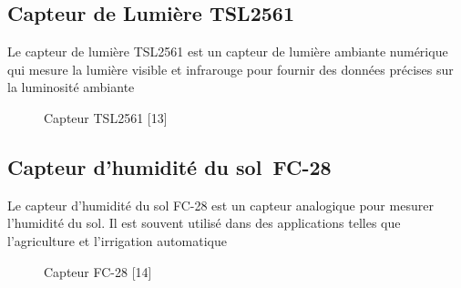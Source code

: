 \subsection{Capteur de Lumière TSL2561}
Le capteur de lumière TSL2561 est un capteur de lumière ambiante numérique qui mesure la lumière visible et infrarouge pour fournir des données précises sur la luminosité ambiante

\begin{figure}[hbt]
\centering
\label{fig:Capteur TSL2561}


 \caption{Capteur TSL2561 [13]}
\end{figure}

\subsection{Capteur d'humidité du sol FC-28}
Le capteur d'humidité du sol FC-28 est un capteur analogique pour mesurer l'humidité du sol. Il est souvent utilisé dans des applications telles que l'agriculture et l'irrigation automatique
\begin{figure}[hbt]
\centering
\label{fig:Capteur FC-28}

\caption{Capteur FC-28 [14]}
\end{figure}


